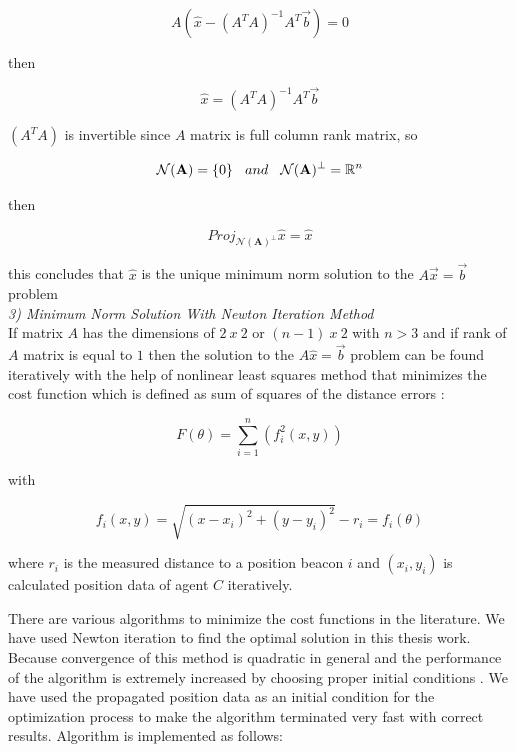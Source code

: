 \begin{equation}
 A(\hat{x} - (A^TA)^{-1}A^T\vec{b}) = 0
\end{equation}

then 

\begin{equation}
\hat{x} = (A^TA)^{-1}A^T\vec{b}
\end{equation}
  
$(A^TA)$ is invertible since $A$ matrix is full column rank matrix, so 

\begin{align}
\begin{split}
\mathcal{N}(\mathbf{A}) = \{0\} \hspace{0.3cm}  and  \hspace{0.3cm}  \mathcal{N}(\mathbf{A})^\perp =\mathbb{R} ^n 
\end{split}
\end{align}
  
then 
  
\begin{equation}
Proj_{ \mathcal{N}(\mathbf{A})^\perp}\hat{x} = \hat{x}
\end{equation}
  
this concludes that $\hat{x}$ is the unique minimum norm solution to the $A\vec{x} = \vec{b}$ problem\\
	
	
\textit{3) Minimum Norm Solution With Newton Iteration Method}\\	
If matrix $A$ has the dimensions of $2\ x\ 2$ or $(n-1)\ x\ 2$ with $n>3$ and if rank of $A$ matrix is equal to $1$ then the solution to the $A\hat{x} = \vec{b}$ problem can be found iteratively with the help of nonlinear least squares method that minimizes the cost function which is defined as sum of squares of the distance errors \cite{22} :
	
\begin{equation} \label{cost_func_tri}
F(\theta) = \sum_{i=1}^{n} \left(f_i^2(x,y)\right)
\end{equation}
	
with
	
\begin{equation}
f_i(x,y) = \sqrt{(x-x_i)^2 + (y - y_i)^2} - r_i = f_i(\theta) 
\end{equation}

where $r_i$ is the measured distance to a position beacon $i$ and $(x_i, y_i)$ is calculated position data of agent $C$ iteratively.

There are various algorithms to minimize the cost functions in the literature. We have used Newton iteration to find the optimal solution in this thesis work. Because convergence of this method is quadratic in general and the performance of the algorithm is extremely increased by choosing proper initial conditions \cite{wiki_newton}. We have used the propagated position data as an initial condition for the optimization process to make the algorithm terminated very fast with correct results. Algorithm is implemented as follows:

